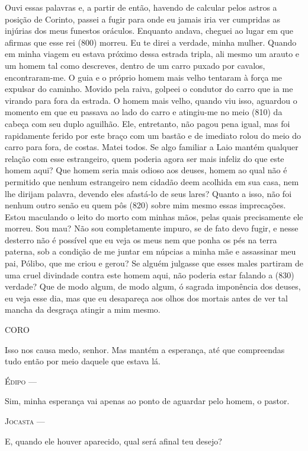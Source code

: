 Ouvi essas palavras e, a partir de então, havendo de calcular pelos
astros a posição de Corinto, passei a fugir para onde eu jamais iria ver
cumpridas as injúrias dos meus funestos oráculos. Enquanto andava,
cheguei ao lugar em que afirmas que esse rei (800) morreu. Eu te direi a
verdade, minha mulher. Quando em minha viagem eu estava próximo dessa
estrada tripla, ali mesmo um arauto e um homem tal como descreves,
dentro de um carro puxado por cavalos, encontraram-me. O guia e o
próprio homem mais velho tentaram à força me expulsar do caminho. Movido
pela raiva, golpeei o condutor do carro que ia me virando para fora da
estrada. O homem mais velho, quando viu isso, aguardou o momento em que
eu passava ao lado do carro e atingiu-me no meio (810) da cabeça com seu
duplo aguilhão. Ele, entretanto, não pagou pena igual, mas foi
rapidamente ferido por este braço com um bastão e de imediato rolou do
meio do carro para fora, de costas. Matei todos. Se algo familiar a Laio
mantém qualquer relação com esse estrangeiro, quem poderia agora ser
mais infeliz do que este homem aqui? Que homem seria mais odioso aos
deuses, homem ao qual não é permitido que nenhum estrangeiro nem cidadão
deem acolhida em sua casa, nem lhe dirijam palavra, devendo eles
afastá-lo de seus lares? Quanto a isso, não foi nenhum outro senão eu
quem pôs (820) sobre mim mesmo essas imprecações. Estou maculando o
leito do morto com minhas mãos, pelas quais precisamente ele morreu. Sou
mau? Não sou completamente impuro, se de fato devo fugir, e nesse
desterro não é possível que eu veja os meus nem que ponha os pés na
terra paterna, sob a condição de me juntar em núpcias a minha mãe e
assassinar meu pai, Pólibo, que me criou e gerou? Se alguém julgasse que
esses males partiram de uma cruel divindade contra este homem aqui, não
poderia estar falando a (830) verdade? Que de modo algum, de modo algum,
ó sagrada imponência dos deuses, eu veja esse dia, mas que eu desapareça
aos olhos dos mortais antes de ver tal mancha da desgraça atingir a mim
mesmo.

\textsc{CORO}

Isso nos causa medo, senhor. Mas mantém a esperança, até que compreendas
tudo então por meio daquele que estava lá.

\textsc{Édipo} ---

Sim, minha esperança vai apenas ao ponto de aguardar pelo homem, o
pastor.

\textsc{Jocasta} ---

E, quando ele houver aparecido, qual será afinal teu desejo?

